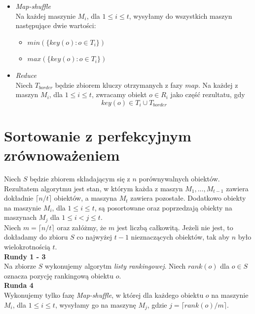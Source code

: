\documentclass{pracamgr}
\begin{document}
\begin{itemize}
    \item \textit{Map-shuffle} \\
    Na każdej maszynie \(M_i\), dla \(1 \leq i \leq t\), wysyłamy do wszystkich maszyn następujące dwie wartości:
        \begin{itemize}
            \item \(min(\{key(o): o \in T_i\})\)
            \item \(max(\{key(o): o \in T_i\})\)
        \end{itemize}
    \item \textit{Reduce} \\
    Niech \(T_{border}\) będzie zbiorem kluczy otrzymanych z fazy \(map\). Na każdej z maszyn \(M_i\), dla \(1 \leq i \leq t\), zwracamy obiekt \(o \in R_i\) jako część rezultatu, gdy
            $$key(o) \in T_i \cup T_{border}$$

\end{itemize}

\section{Sortowanie z perfekcyjnym zrównoważeniem} \label{perfect_sort}

Niech \(S\) będzie zbiorem składającym się z \(n\) porównywalnych obiektów. Rezultatem algorytmu jest stan, w którym każda z maszyn \(M_1, ..., M_{t-1}\) zawiera dokładnie \( \lceil n / t \rceil\) obiektów, a maszyna \(M_t\) zawiera pozostałe. Dodatkowo obiekty na maszynie \(M_i\), dla \(1 \leq i \leq t\), są posortowane oraz poprzedzają obiekty na maszynach \(M_j\) dla \(1 \leq i < j \leq t\). \\

Niech \(m = \lceil n / t \rceil\) oraz załóżmy, że \(m\) jest liczbą całkowitą. Jeżeli nie jest, to dokładamy do zbioru \(S\) co najwyżej \(t - 1\) nieznaczących obiektów, tak aby \(n\) było wielokrotnością \(t\). \\

\textbf{Rundy 1 - 3} \\
Na zbiorze \(S\) wykonujemy algorytm \textit{listy rankingowej}. Niech \(rank(o)\) dla \(o \in S\) oznacza pozycję rankingową obiektu \(o\). \\

\textbf{Runda 4} \\
Wykonujemy tylko fazę \textit{Map-shuffle}, w której dla każdego obiektu \(o\) na maszynie \(M_i\), dla \(1 \leq i \leq t\), wysyłamy go na maszynę \(M_j\), gdzie \(j = \lceil rank(o) / m \rceil\).
\end{document}
